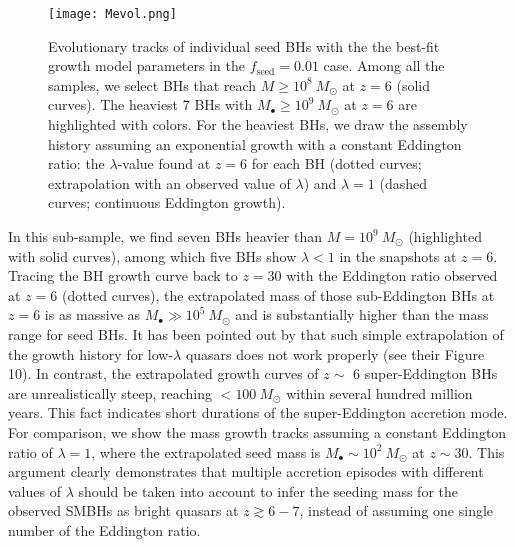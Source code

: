 \documentclass[twocolumn, twocolappendix]{aastex63}
\newcommand{\Msun}{M_\odot}
\newcommand{\Mbh}{M_\bullet}
\newcommand{\fseed}{f_\mathrm{seed}}
\begin{document}
\begin{CJK*}{UTF8}{gbsn}
\begin{figure}
\centering
\texttt{[image: Mevol.png]}
\caption{
Evolutionary tracks of individual seed BHs with the the best-fit growth model parameters in the $\fseed=0.01$ case.
Among all the samples, we select BHs that reach $M\geq 10^8~\Msun$ at $z=6$ (solid curves). 
The heaviest 7 BHs with $M_\bullet \geq 10^9~\Msun$ at $z=6$ are highlighted with colors. 
For the heaviest BHs, we draw the assembly history assuming an exponential growth with a constant Eddington ratio: 
the $\lambda$-value found at $z=6$ for each BH (dotted curves; extrapolation with an observed value of $\lambda$) and 
$\lambda =1$ (dashed curves; continuous Eddington growth).
}
\label{fig:track}
\end{figure}


In this sub-sample, we find seven BHs heavier than $M=10^9~\Msun$ (highlighted with solid curves), 
among which five BHs show $\lambda<1$ in the snapshots at $z=6$.
Tracing the BH growth curve back to $z=30$ with the Eddington ratio observed at $z=6$ (dotted curves),
the extrapolated mass of those sub-Eddington BHs at $z=6$ is as massive as $\Mbh \gg 10^5~\Msun$ and is 
substantially higher than the mass range for seed BHs.
%
It has been pointed out by \cite{2019ApJ...880...77O} that such simple extrapolation of the growth history for low-$\lambda$ quasars 
does not work properly (see their Figure 10).
%
In contrast, the extrapolated growth curves of $z\sim$ 6 super-Eddington BHs are unrealistically steep,
reaching $<100 ~\Msun$ within several hundred million years.
This fact indicates short durations of the super-Eddington accretion mode.
For comparison, we show the mass growth tracks assuming a constant Eddington ratio of $\lambda=1$, 
where the extrapolated seed mass is $\Mbh \sim 10^2~\Msun$ at $z\sim 30$.
This argument clearly demonstrates that multiple accretion episodes with different values of $\lambda$ should be taken into account 
to infer the seeding mass for the observed SMBHs as bright quasars at $z\gtrsim 6-7$, instead of assuming one single number 
of the Eddington ratio.



\end{CJK*}
\end{document}
